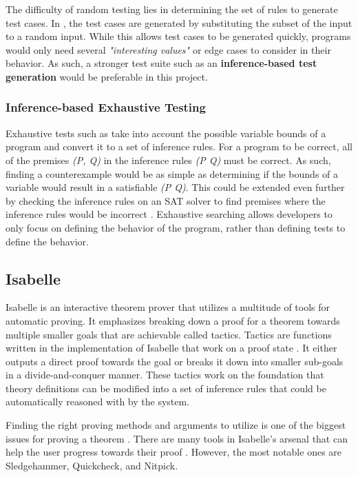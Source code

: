 The difficulty of random testing lies in determining the set of rules to generate test cases. In \cite{differentialTesting}, the test cases 
are generated by substituting the subset of the input to a random input. While this allows test cases to be generated quickly, programs would only 
need several \emph{"interesting values"} or edge cases to consider in their behavior. As such, a stronger test suite such as an 
\textbf{inference-based test generation} would be preferable in this project.

\subsubsection{Inference-based Exhaustive Testing}
\label{sec:inferenceTesting}

Exhaustive tests such as \cite{isabelleQuickcheck} take into account the possible variable bounds of a program and convert it to a set of 
inference rules. For a program to be correct, all of the premises \emph{(P, Q)} in the inference rules \emph{(P \rightarrow Q)} must be correct. As 
such, finding a counterexample would be as simple as determining if the bounds of a variable would result in a satisfiable \emph{\lnot(P \rightarrow Q)}. 
This could be extended even further by checking the inference rules on an SAT solver to find premises where the inference rules would be incorrect 
\cite[Ch. 5]{isabelleProof}. Exhaustive searching allows developers to only focus on defining the behavior of the program, rather than defining 
tests to define the behavior.

\subsection{Isabelle}
\label{sec:Isabelle}

Isabelle is an interactive theorem prover that utilizes a multitude of tools for automatic proving. It emphasizes breaking down a proof 
for a theorem towards multiple smaller goals that are achievable called tactics. Tactics are functions written in the implementation of Isabelle 
that work on a proof state \cite{isabelleProof}. It either outputs a direct proof towards the goal or breaks it down into smaller sub-goals 
in a divide-and-conquer manner. These tactics work on the foundation that theory definitions can be modified into a set of inference rules that 
could be automatically reasoned with by the system.

Finding the right proving methods and arguments to utilize is one of the biggest issues for proving a theorem \cite{isabelleProof}. There are 
many tools in Isabelle's arsenal that can help the user progress towards their proof \cite{IsabelleHOL}. However, the most notable ones are 
Sledgehammer, Quickcheck, and Nitpick.


